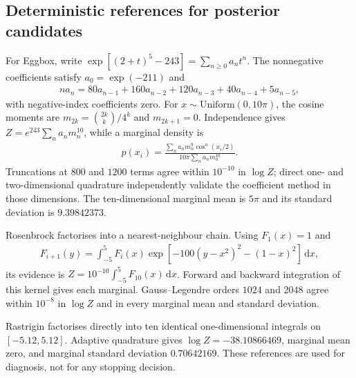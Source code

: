 \documentclass[pdflatex,sn-basic,icol]{sn-jnl}
\newcommand{\dd}{\mathrm{d}}
\newcommand{\Unif}{\mathrm{Uniform}}
\theoremstyle{plain}
\theoremstyle{definition}
\begin{document}
\begin{appendices}
\section{Deterministic references for posterior candidates}\label{sec:posterior_references}

For Eggbox, write $\exp[(2+t)^5-243]=\sum_{n\ge0}a_nt^n$.
The nonnegative coefficients satisfy $a_0=\exp(-211)$ and
\begin{align}
    n a_n=80a_{n-1}+160a_{n-2}+120a_{n-3}+40a_{n-4}+5a_{n-5},
\end{align}
with negative-index coefficients zero.
For $x\sim\Unif(0,10\pi)$, the cosine moments are $m_{2k}=\binom{2k}{k}/4^k$ and $m_{2k+1}=0$.
Independence gives $Z=e^{243}\sum_n a_n m_n^{10}$, while a marginal density is
\begin{align}
    p(x_i)=\frac{\sum_n a_n m_n^9\cos^n(x_i/2)}
    {10\pi\sum_n a_n m_n^{10}}.
\end{align}
Truncations at $800$ and $1200$ terms agree within $10^{-10}$ in $\log Z$; direct one- and two-dimensional quadrature independently validate the coefficient method in those dimensions.
The ten-dimensional marginal mean is $5\pi$ and its standard deviation is $9.39842373$.

Rosenbrock factorises into a nearest-neighbour chain.
Using $F_1(x)=1$ and
\begin{align}
    F_{i+1}(y)=\int_{-5}^{5} F_i(x)
    \exp\!\left[-100(y-x^2)^2-(1-x)^2\right]\,\dd x,
\end{align}
its evidence is $Z=10^{-10}\int_{-5}^{5}F_{10}(x)\,\dd x$.
Forward and backward integration of this kernel gives each marginal.
Gauss--Legendre orders $1024$ and $2048$ agree within $10^{-8}$ in $\log Z$ and in every marginal mean and standard deviation.

Rastrigin factorises directly into ten identical one-dimensional integrals on $[-5.12,5.12]$.
Adaptive quadrature gives $\log Z=-38.10866469$, marginal mean zero, and marginal standard deviation $0.70642169$.
These references are used for diagnosis, not for any stopping decision.

\end{appendices}


\end{document}
